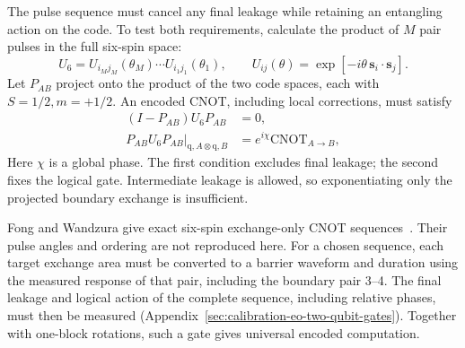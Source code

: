 The pulse sequence must cancel any final leakage while retaining
an entangling action on the code. To test both requirements,
calculate the product of $M$ pair pulses in the full six-spin space:
\begin{equation}
 U_6=U_{i_Mj_M}(\theta_M)\cdots U_{i_1j_1}(\theta_1),
 \qquad
 U_{ij}(\theta)=\exp[-i\theta\,\mathbf{s}_i\cdot\mathbf{s}_j].
 \label{eq:encoded-six-spin-sequence}
\end{equation}
Let $P_{AB}$ project onto the product of the two code spaces,
each with $S=1/2,m=+1/2$. An encoded CNOT, including local corrections,
must satisfy
\begin{equation}
 \begin{aligned}
  (I-P_{AB})U_6P_{AB}&=0,\\
  \left.P_{AB}U_6P_{AB}\right|_{\mathrm{q},A\otimes\mathrm{q},B}
      &=e^{i\chi}\mathrm{CNOT}_{A\to B},
 \end{aligned}
 \label{eq:encoded-cnot-target}
\end{equation}
Here $\chi$ is a global phase.
The first condition excludes final leakage; the second fixes the
logical gate. Intermediate leakage is allowed, so exponentiating
only the projected boundary exchange is insufficient.

Fong and Wandzura give exact six-spin exchange-only
CNOT sequences~\cite{FongWandzura2011}. Their pulse angles and
ordering are not reproduced here. For a chosen sequence, each
target exchange area must be converted to a barrier waveform and
duration using the measured response of that pair, including the
boundary pair 3--4. The final leakage and logical action of the
complete sequence, including relative phases, must then be measured
(Appendix~\ref{sec:calibration-eo-two-qubit-gates}). Together with
one-block rotations, such a gate gives universal encoded computation.

